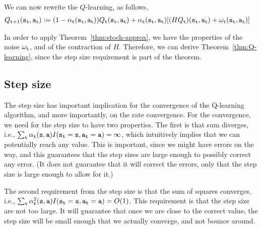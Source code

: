 We can now rewrite the $Q$-learning, as follows,
\begin{align*}
 Q_{{\tt t}+1}({\tt s}_{\tt t},{\tt a}_{\tt t}) & :=   (1-\alpha_{\tt t}({\tt s}_{\tt t},{\tt a}_{\tt t}) ) Q_{\tt t} ({\tt s}_{\tt t},{\tt a}_{\tt t}) + \alpha_{\tt t}({\tt s}_{\tt t},{\tt a}_{\tt t})
 [(HQ_{\tt t})({\tt s}_{\tt t},{\tt a}_{\tt t})+\omega_{\tt t}({\tt s}_{\tt t},{\tt a}_{\tt t})]
\end{align*}

In order to apply Theorem~\ref{thm:stoch-approx}, we have the
properties of the noise $\omega_{\tt t}$, and of the contraction of
$H$. Therefore, we can derive Theorem~\ref{thm:Q-learning}, since
the step size requirement is part of the theorem.

\subsection{Step size}

The step size has important implication for the convergence of the
Q-learning algorithm, and more importantly, on the rate convergence.
For the convergence, we need for the step size to have two
properties. The first is that sum diverges, i.e., $\sum_{\tt t}
\alpha_{\tt t}({\tt s},{\tt a})
I({\tt s}_{\tt t}={\tt s},{\tt a}_{\tt t}={\tt a})=\infty $, which
intuitively implies that we can potentially reach any value. This is
important, since we might have errors on the way, and this
guarantees that the step sizes are large enough to possibly
correct any error. (It does not guarantee that it will correct the
errors, only that the step size is large enough to allow for it.)

The second requirement from the step size is that the sum of squares
converges, i.e., $\sum_{\tt t} \alpha_{\tt t}^2({\tt s},{\tt a})
I({\tt s}_{\tt t}={\tt s},{\tt a}_{\tt t}={\tt a})=O(1)$. This
requirement is that the step size are not too large. It will
guarantee that once we are close to the correct value, the step size
will be small enough that we actually converge, and not bounce
around.

